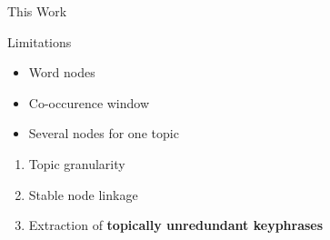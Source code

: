   \begin{frame}[t]{This Work}
    \begin{block}{Limitations}
      \begin{itemize}
        \item{Word nodes}
        \item{Co-occurence window}
        \item{Several nodes for one topic}
      \end{itemize}
    \end{block}

    \begin{enumerate}
      \item{Topic granularity}
      \item{Stable node linkage}
      \item{Extraction of \textbf{topically unredundant keyphrases}}
    \end{enumerate}
  \end{frame}

